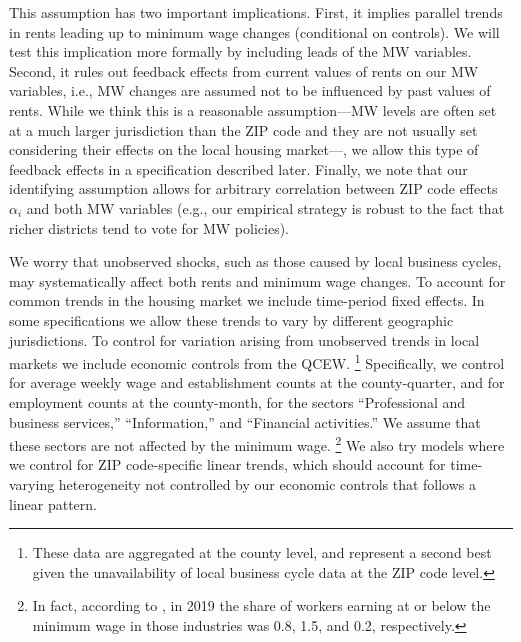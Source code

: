 This assumption has two important implications.
First,
it implies parallel trends in rents leading up to minimum wage changes 
(conditional on controls). We will test this implication more formally by 
including leads of the MW variables.
Second,
it rules out feedback effects from current values of rents on our MW variables, 
i.e., MW changes are assumed not to be influenced by past values of rents.
While we think this is a reasonable assumption---MW levels are often set at a 
much larger jurisdiction than the ZIP code and they are not usually
set considering their effects on the local housing market---, we allow this type of 
feedback effects in a specification described later.
Finally, we note that our identifying assumption allows for arbitrary 
correlation between ZIP code effects $\alpha_i$ and both MW variables
(e.g., our empirical strategy is robust to the fact that richer districts tend 
to vote for MW policies).

We worry that unobserved shocks, such as those caused by local business cycles, 
may systematically affect both rents and minimum wage changes.
To account for common trends in the housing market we include time-period 
fixed effects.
In some specifications we allow these trends to vary by different geographic 
jurisdictions. To control for variation arising from unobserved trends in local 
markets we include economic controls from the QCEW.%
\footnote{These data are aggregated at the county level, and represent a second 
best given the unavailability of local business cycle data at the ZIP code level.}
Specifically, we control for average weekly wage and establishment counts at the 
county-quarter, and for employment counts at the county-month, for the sectors 
``Professional and business services,'' ``Information,'' and 
``Financial activities.''
We assume that these sectors are not affected by the minimum wage.%
\footnote{In fact, according to \textcite[][Table 5]{MinWorkersReportBLS}, in 
2019 the share of workers earning at or below the minimum wage in those 
industries was 0.8, 1.5, and 0.2, respectively.}
We also try models where we control for ZIP code-specific linear
trends, which should account for time-varying heterogeneity not controlled by 
our economic controls that follows a linear pattern.

